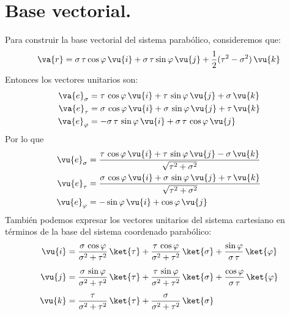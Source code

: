 \section{Base vectorial.}
Para construir la base vectorial del sistema parabólico, consideremos que:
\begin{align*}
\va{r} = \sigma \, \tau \cos \varphi \, \vu{i} + \sigma \, \tau \sin \varphi \, \vu{j} + \dfrac{1}{2} (\tau^{2} - \sigma^{2}) \, \vu{k}
\end{align*}
Entonces los vectores unitarios son:
\begin{align*}
\va{e}_{\sigma} &= \tau \, \cos \varphi \, \vu{i} + \tau \, \sin \varphi \, \vu{j} + \sigma \, \vu{k} \\
\va{e}_{\tau} &= \sigma \, \cos \varphi \, \vu{i} + \sigma \, \sin \varphi \, \vu{j} + \tau \, \vu{k} \\
\va{e}_{\varphi} &= - \sigma \, \tau \, \sin \varphi \, \vu{i} + \sigma \, \tau \, \cos \varphi \, \vu{j}
\end{align*}
Por lo que
\begin{align*}
\vu{e}_{\sigma} &= \dfrac{\tau \, \cos \varphi \, \vu{i} + \tau \, \sin \varphi \, \vu{j} - \sigma \, \vu{k}}{\sqrt{\tau^{2} + \sigma^{2}}} \\
\vu{e}_{\tau} &= \dfrac{\sigma \, \cos \varphi \, \vu{i} + \sigma \, \sin \varphi \, \vu{j} + \tau \, \vu{k}}{\sqrt{\tau^{2} + \sigma^{2}}} \\
\vu{e}_{\varphi} &= - \sin \varphi \, \vu{i} + \cos \varphi \, \vu{j}
\end{align*}
También podemos expresar los vectores unitarios del sistema cartesiano en términos de la base del sistema coordenado parabólico:
\begin{align*}
\vu{i} &= \dfrac{\sigma \, \cos \varphi}{\sigma^{2} + \tau^{2}} \, \ket{\tau} + \dfrac{\tau \, \cos \varphi}{\sigma^{2} + \tau^{2}} \, \ket{\sigma} + \dfrac{\sin \varphi}{\sigma \, \tau} \, \ket{\varphi} \\[0.5em]
\vu{j} &= \dfrac{\sigma \, \sin \varphi}{\sigma^{2} + \tau^{2}} \, \ket{\tau} + \dfrac{\tau \, \sin \varphi}{\sigma^{2} + \tau^{2}} \, \ket{\sigma} + \dfrac{\cos \varphi}{ \sigma \, \tau} \, \ket{\varphi} \\[0.5em]
\vu{k} &= \dfrac{\tau}{\sigma^{2} + \tau^{2}} \, \ket{\tau} + \dfrac{\sigma}{\sigma^{2} + \tau^{2}} \, \ket{\sigma}
\end{align*}
